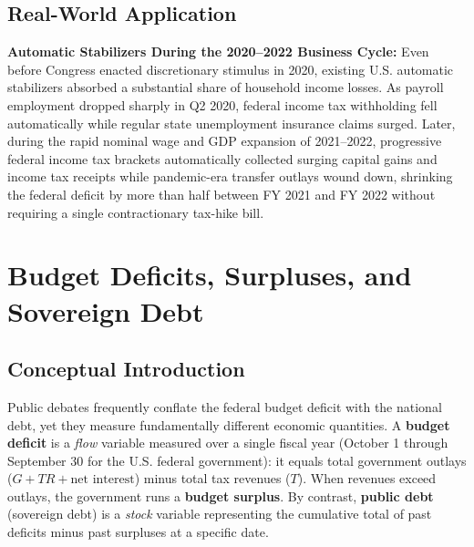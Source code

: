 \documentclass[11pt,letterpaper]{article}
\begin{document}
\subsection*{Real-World Application}
\textbf{Automatic Stabilizers During the 2020--2022 Business Cycle:} Even before Congress enacted discretionary stimulus in 2020, existing U.S. automatic stabilizers absorbed a substantial share of household income losses. As payroll employment dropped sharply in Q2 2020, federal income tax withholding fell automatically while regular state unemployment insurance claims surged. Later, during the rapid nominal wage and GDP expansion of 2021--2022, progressive federal income tax brackets automatically collected surging capital gains and income tax receipts while pandemic-era transfer outlays wound down, shrinking the federal deficit by more than half between FY 2021 and FY 2022 without requiring a single contractionary tax-hike bill.

\section{Budget Deficits, Surpluses, and Sovereign Debt}

\subsection*{Conceptual Introduction}
Public debates frequently conflate the federal budget deficit with the national debt, yet they measure fundamentally different economic quantities. A \textbf{budget deficit} is a \emph{flow} variable measured over a single fiscal year (October 1 through September 30 for the U.S. federal government): it equals total government outlays ($G + TR + \text{net interest}$) minus total tax revenues ($T$). When revenues exceed outlays, the government runs a \textbf{budget surplus}. By contrast, \textbf{public debt} (sovereign debt) is a \emph{stock} variable representing the cumulative total of past deficits minus past surpluses at a specific date.
\end{document}
